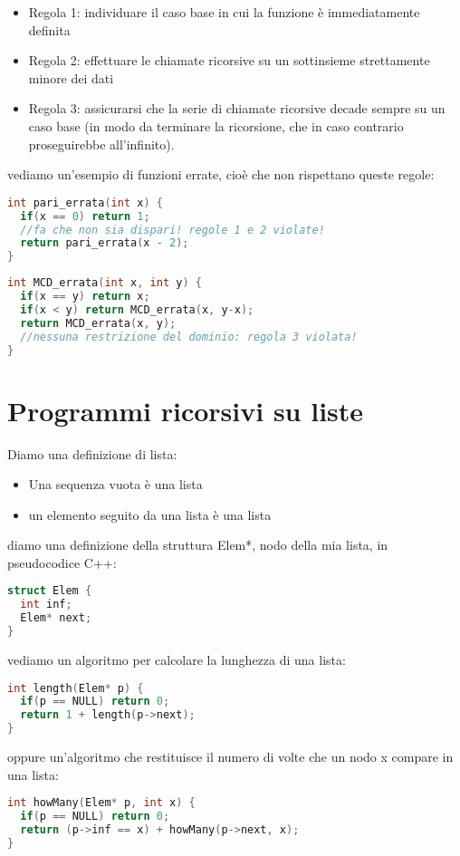 \documentclass[a4paper,12pt]{article}
\begin{document}
\begin{itemize}
  \item Regola 1:
    individuare il caso base in cui la funzione è immediatamente definita
  \item Regola 2:
    effettuare le chiamate ricorsive su un sottinsieme strettamente minore dei dati
  \item Regola 3:
    assicurarsi che la serie di chiamate ricorsive decade sempre su un caso base (in modo da terminare
    la ricorsione, che in caso contrario proseguirebbe all'infinito).
\end{itemize}

vediamo un'esempio di funzioni errate, cioè che non rispettano queste regole:
\begin{lstlisting}[language=C++]
int pari_errata(int x) {
  if(x == 0) return 1;
  //fa che non sia dispari! regole 1 e 2 violate!
  return pari_errata(x - 2);
}
\end{lstlisting}
\begin{lstlisting}[language=C++]
int MCD_errata(int x, int y) {
  if(x == y) return x;
  if(x < y) return MCD_errata(x, y-x);
  return MCD_errata(x, y); 
  //nessuna restrizione del dominio: regola 3 violata!
}
\end{lstlisting}

\section{Programmi ricorsivi su liste}
Diamo una definizione di lista:
\begin{itemize}
  \item Una sequenza vuota è una lista
  \item un elemento seguito da una lista è una lista
\end{itemize}

diamo una definizione della struttura Elem*, nodo della mia lista, in pseudocodice C++:
\begin{lstlisting}[language=C++]
struct Elem {
  int inf;
  Elem* next;
}
\end{lstlisting}

vediamo un algoritmo per calcolare la lunghezza di una lista:
\begin{lstlisting}[language=C++]
int length(Elem* p) {
  if(p == NULL) return 0;
  return 1 + length(p->next);
}
\end{lstlisting}

oppure un'algoritmo che restituisce il numero di volte che un nodo x compare in una lista:
\begin{lstlisting}[language=C++]
int howMany(Elem* p, int x) {
  if(p == NULL) return 0;
  return (p->inf == x) + howMany(p->next, x);
}
\end{lstlisting}
\end{document}
